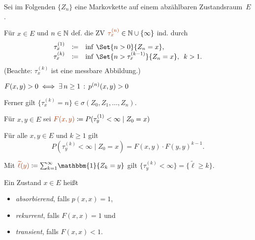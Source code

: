 \documentclass{cheat-sheet}
\newcommand{\ind}{\mathbbm{1}} %
\newcommand{\Defn}[1]{\textcolor{DefinitionColor}{#1}}
\begin{document}

\begin{nota}
  Sei im Folgenden $\{ Z_n \}$ eine Markovkette auf einem abzählbaren Zustandsraum~$E$.
\end{nota}

\begin{defn}
  Für $x \in E$ und $n \in \mathbb{N}$ def. die ZV $\Defn{\tau_x^{(n)}} \in \N \cup \{ \infty \}$ ind. durch
  \[ \begin{array}{r c l}
    \tau_x^{(1)} &\coloneqq& \inf\,\Set{n > 0}{Z_n = x}, \\
    \tau_x^{(k)} &\coloneqq& \inf\,\Set{n > \tau_x^{(k-1)}}{Z_n = x}, \enspace k > 1.
  \end{array} \]
  (Beachte: $\tau_x^{(k)}$ ist eine messbare Abbildung.)
\end{defn}

\begin{bem}
  $F(x, y) > 0 \iff \exists \, {n \geq 1} \,:\, p^{(n)}(x, y) > 0$
\end{bem}

\begin{bem}
  Ferner gilt $\{ \tau_x^{(k)} = n \} \in \sigma(Z_0, Z_1, \ldots, Z_n)$.
\end{bem}

\begin{defn}
  Für $x, y \in E$ sei
  $\Defn{F(x, y)} \coloneqq P(\tau_y^{(1)} < \infty \mid Z_0 = x)$
\end{defn}

\begin{lem}
  Für alle $x, y \in E$ und $k \geq 1$ gilt
  \[ P(\tau_y^{(k)} < \infty \mid Z_0 = x) = F(x, y) \cdot F(y, y)^{k-1}. \]
\end{lem}

\begin{bem}
  Mit $\Defn{\widetilde{\ell}(y)} \coloneqq {\sum}_{k=1}^\infty \ind \{ Z_k = y \}$
  gilt $\{ \tau_y^{(k)} \!<\! \infty \} = \{ \widetilde{\ell} \geq k \}$.
\end{bem}

\begin{defn}
  Ein Zustand $x \in E$ heißt
  \begin{itemize}
    \item \emph{absorbierend}, falls $p(x, x) = 1$,
    \item \emph{rekurrent}, falls $F(x, x) = 1$ und
    \item \emph{transient}, falls $F(x, x) < 1$.
  \end{itemize}
\end{defn}
\end{document}
